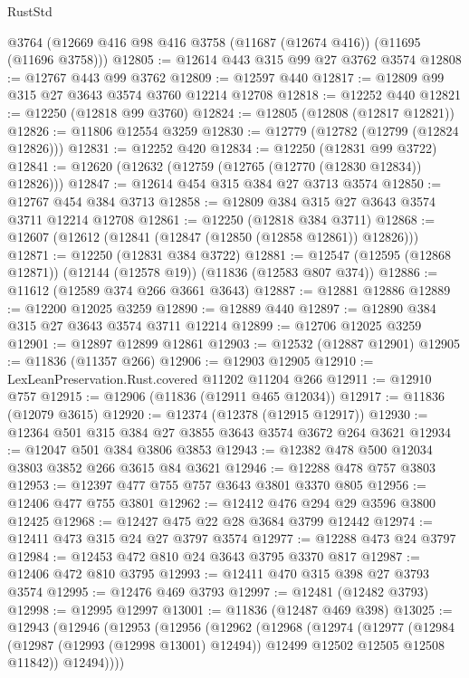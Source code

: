 \begin{lexlean}{RustStd}
\begin{coremodule}
    @3764
    (@12669 @416 @98 @416 @3758 (@11687 (@12674 @416)) (@11695 (@11696 @3758)))
@12805 := @12614 @443 @315 @99 @27 @3762 @3574
@12808 := @12767 @443 @99 @3762
@12809 := @12597 @440
@12817 := @12809 @99 @315 @27 @3643 @3574 @3760 @12214 @12708
@12818 := @12252 @440
@12821 := @12250 (@12818 @99 @3760)
@12824 := @12805 (@12808 (@12817 @12821))
@12826 := @11806 @12554 @3259
@12830 := @12779 (@12782 (@12799 (@12824 @12826)))
@12831 := @12252 @420
@12834 := @12250 (@12831 @99 @3722)
@12841 := @12620 (@12632 (@12759 (@12765 (@12770 (@12830 @12834)) @12826)))
@12847 := @12614 @454 @315 @384 @27 @3713 @3574
@12850 := @12767 @454 @384 @3713
@12858 := @12809 @384 @315 @27 @3643 @3574 @3711 @12214 @12708
@12861 := @12250 (@12818 @384 @3711)
@12868 := @12607 (@12612 (@12841 (@12847 (@12850 (@12858 @12861)) @12826)))
@12871 := @12250 (@12831 @384 @3722)
@12881 := @12547 (@12595 (@12868 @12871)) (@12144 (@12578 @19)) (@11836 (@12583 @807 @374))
@12886 := @11612 (@12589 @374 @266 @3661 @3643)
@12887 := @12881 @12886
@12889 := @12200 @12025 @3259
@12890 := @12889 @440
@12897 := @12890 @384 @315 @27 @3643 @3574 @3711 @12214
@12899 := @12706 @12025 @3259
@12901 := @12897 @12899 @12861
@12903 := @12532 (@12887 @12901)
@12905 := @11836 (@11357 @266)
@12906 := @12903 @12905
@12910 := LexLeanPreservation.Rust.covered @11202 @11204 @266
@12911 := @12910 @757
@12915 := @12906 (@11836 (@12911 @465 @12034))
@12917 := @11836 (@12079 @3615)
@12920 := @12374 (@12378 (@12915 @12917))
@12930 := @12364 @501 @315 @384 @27 @3855 @3643 @3574 @3672 @264 @3621
@12934 := @12047 @501 @384 @3806 @3853
@12943 := @12382 @478 @500 @12034 @3803 @3852 @266 @3615 @84 @3621
@12946 := @12288 @478 @757 @3803
@12953 := @12397 @477 @755 @757 @3643 @3801 @3370 @805
@12956 := @12406 @477 @755 @3801
@12962 := @12412 @476 @294 @29 @3596 @3800 @12425
@12968 := @12427 @475 @22 @28 @3684 @3799 @12442
@12974 := @12411 @473 @315 @24 @27 @3797 @3574
@12977 := @12288 @473 @24 @3797
@12984 := @12453 @472 @810 @24 @3643 @3795 @3370 @817
@12987 := @12406 @472 @810 @3795
@12993 := @12411 @470 @315 @398 @27 @3793 @3574
@12995 := @12476 @469 @3793
@12997 := @12481 (@12482 @3793)
@12998 := @12995 @12997
@13001 := @11836 (@12487 @469 @398)
@13025 := @12943
    (@12946
      (@12953
        (@12956
          (@12962
            (@12968
              (@12974
                (@12977
                  (@12984
                    (@12987 (@12993 (@12998 @13001) @12494))
                    @12499
                    @12502
                    @12505
                    @12508
                    @11842))
                @12494))))

\end{coremodule}
\end{lexlean}
